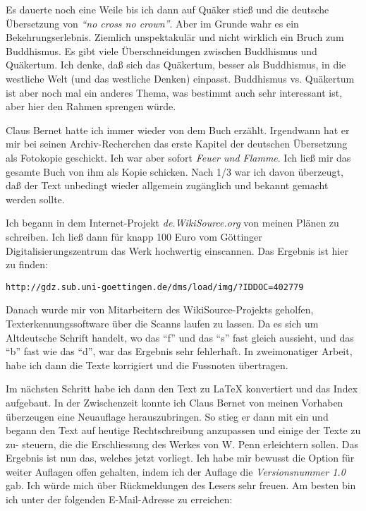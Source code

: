 \medskip

Es dauerte noch eine Weile bis ich dann auf Quäker stieß und die deutsche
Übersetzung von \textit{"`no cross no crown"'}. Aber im Grunde wahr es ein
Bekehrungserlebnis. Ziemlich unspektakulär und nicht wirklich ein Bruch zum
Buddhismus. Es gibt viele Überschneidungen zwischen Buddhismus und Quäkertum.
Ich denke, daß sich das Quäkertum, besser als Buddhismus, in die westliche Welt (und das westliche
Denken) einpasst. Buddhismus vs. Quäkertum ist aber noch mal
ein anderes Thema, was bestimmt auch sehr interessant ist, aber hier den Rahmen
sprengen würde.


\medskip

Claus Bernet hatte ich immer wieder von dem Buch erzählt. Irgendwann hat er mir
bei seinen Archiv-Recherchen das erste Kapitel der deutschen Übersetzung als
Fotokopie geschickt. Ich war aber sofort \textit{Feuer und
Flamme}. Ich ließ mir das gesamte Buch von ihm als Kopie schicken. Nach 1/3 war
ich davon überzeugt, daß der Text unbedingt wieder allgemein zugänglich und
bekannt gemacht werden sollte.

\medskip

Ich begann in dem Internet-Projekt \textit{de.WikiSource.org} von meinen Plänen
zu schreiben. Ich ließ dann für knapp 100 Euro vom Göttinger
Digitalisierungszentrum das Werk hochwertig einscannen. Das Ergebnis ist hier zu
finden:

\begin{center}
\texttt{http://gdz.sub.uni-goettingen.de/dms/load/img/?IDDOC=402779}
\end{center}

Danach wurde mir von Mitarbeitern des WikiSource-Projekts geholfen,
Texterkennungssoftware über die Scanns laufen zu lassen. Da es sich um
Altdeutsche Schrift handelt, wo das "`f"' und das "`s"' fast gleich aussieht,
und das "`b"' fast wie das "`d"', war das Ergebnis sehr fehlerhaft. In
zweimonatiger Arbeit, habe ich dann die Texte korrigiert und die Fussnoten
übertragen.


\medskip

Im nächsten Schritt habe ich dann den Text zu \LaTeX{} konvertiert und das Index
aufgebaut. In der Zwischenzeit konnte ich Claus Bernet von meinen Vorhaben überzeugen eine
Neuauflage herauszubringen. So stieg er dann mit ein und begann
den Text auf heutige Rechtschreibung anzupassen und einige der Texte zu zu-
steuern, die die Erschliessung des Werkes von W. Penn erleichtern sollen.
Das Ergebnis ist nun das, welches jetzt vorliegt. Ich habe mir bewusst die
Option für weiter Auflagen offen gehalten, indem ich der Auflage die
\textit{Versionsnummer 1.0} gab. Ich würde mich über Rückmeldungen des Lesers
sehr freuen. Am besten bin ich unter der folgenden E-Mail-Adresse zu erreichen:

